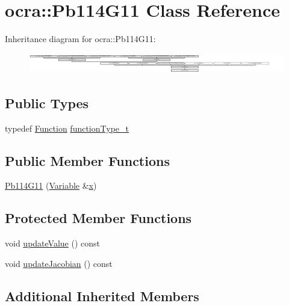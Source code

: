 \hypertarget{classocra_1_1Pb114G11}{}\section{ocra\+:\+:Pb114\+G11 Class Reference}
\label{classocra_1_1Pb114G11}
Inheritance diagram for ocra\+:\+:Pb114\+G11\+:\begin{figure}[H]
\begin{center}
\leavevmode
\includegraphics[height=0.901771cm]{da/d6c/classocra_1_1Pb114G11}
\end{center}
\end{figure}
\subsection*{Public Types}
\begin{DoxyCompactItemize}
\item 
typedef \hyperlink{classocra_1_1Function}{Function} \hyperlink{classocra_1_1Pb114G11_a6a78a86715026be7613e399955407e93}{function\+Type\+\_\+t}
\end{DoxyCompactItemize}
\subsection*{Public Member Functions}
\begin{DoxyCompactItemize}
\item 
\hyperlink{classocra_1_1Pb114G11_a530be5f34e9ae31c8db6b1a62658dbe6}{Pb114\+G11} (\hyperlink{classocra_1_1Variable}{Variable} \&\hyperlink{classocra_1_1Function_a28825886d1f149c87b112ec2ec1dd486}{x})
\end{DoxyCompactItemize}
\subsection*{Protected Member Functions}
\begin{DoxyCompactItemize}
\item 
void \hyperlink{classocra_1_1Pb114G11_a21e66a9f60492d3c0ff7ed678d39de56}{update\+Value} () const
\item 
void \hyperlink{classocra_1_1Pb114G11_a5dcd54dcc5ef337f78083f676d5d03bb}{update\+Jacobian} () const
\end{DoxyCompactItemize}
\subsection*{Additional Inherited Members}


